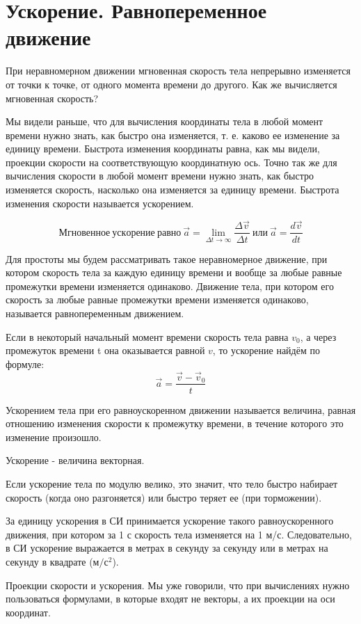 \documentclass[a6paper, 11pt]{diss_4}
\renewcommand{\'}{\,'}
\begin{document}
\section{Ускорение. Равнопеременное движение}

  При неравномерном движении мгновенная скорость тела непрерывно
изменяется от точки к точке, от одного момента времени до другого. Как же
вычисляется мгновенная скорость?

  Мы видели раньше, что для вычисления координаты тела в любой момент
времени нужно знать, как быстро она изменяется, т. е. каково ее изменение за
единицу времени. Быстрота изменения координаты равна, как мы видели, проекции
скорости на соответствующую координатную ось. Точно так же для вычисления
скорости в любой момент времени нужно знать, как быстро изменяется скорость,
насколько она изменяется за единицу времени. Быстрота изменения скорости
называется ускорением.

\[Мгновенное\ ускорение\ равно\ \vec{a}=\lim_{\Delta t\to\infty}\frac{\Delta\vec{v}}{\Delta t}
\ или \ \vec{a}=\frac{d\vec{v}}{dt}
\]

  Для простоты мы будем рассматривать такое неравномерное движение, при
котором скорость тела за каждую единицу времени и вообще за любые равные
промежутки времени изменяется одинаково. Движение тела, при котором его
скорость за любые равные промежутки времени изменяется одинаково, называется
равнопеременным движением.

 Если в некоторый начальный момент времени скорость тела равна $v_0$, а через
промежуток времени t она оказывается равной $v$, то ускорение найдём по формуле:
\[\vec{a}=\frac{\vec{v}-\vec{v}_0}{t}\]


  Ускорением тела при его равноускоренном движении называется величина,
равная отношению изменения скорости к промежутку времени, в течение которого
это изменение произошло.

  Ускорение - величина векторная.

  Если ускорение тела по модулю велико, это значит, что тело быстро
набирает скорость (когда оно разгоняется) или быстро теряет ее (при торможении).

  За единицу ускорения в СИ принимается ускорение такого равноускоренного
движения, при котором за 1 с скорость тела изменяется на 1 м/с. Следовательно,
в СИ ускорение выражается в метрах в секунду за секунду или в метрах на секунду
в квадрате ($м/с^2$).

 Проекции скорости и ускорения. Мы уже говорили, что при вычислениях нужно
пользоваться формулами, в которые входят не векторы, а их проекции на оси
координат.
\end{document}
